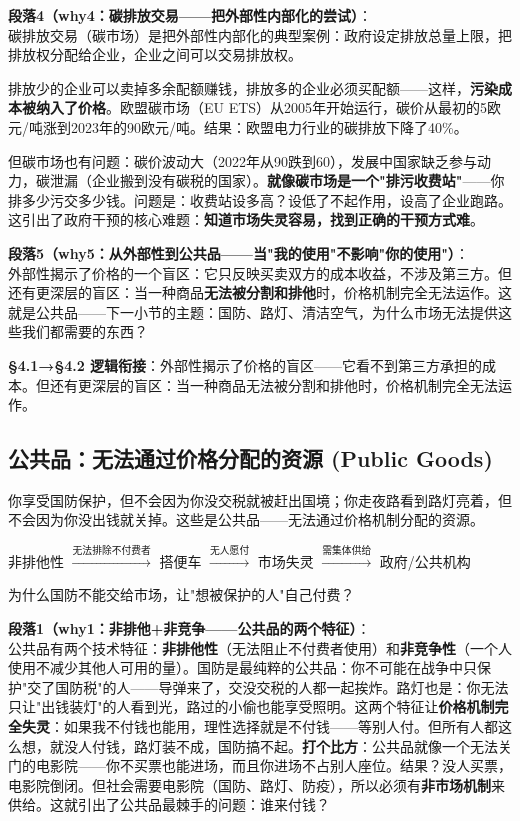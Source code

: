 \documentclass[../main.tex]{subfiles}
\begin{document}
	\textbf{段落4（why4：碳排放交易——把外部性内部化的尝试）}：\\
	碳排放交易（碳市场）是把外部性内部化的典型案例：政府设定排放总量上限，把排放权分配给企业，企业之间可以交易排放权。

	排放少的企业可以卖掉多余配额赚钱，排放多的企业必须买配额——这样，\textbf{污染成本被纳入了价格}。欧盟碳市场（EU ETS）从2005年开始运行，碳价从最初的5欧元/吨涨到2023年的90欧元/吨。结果：欧盟电力行业的碳排放下降了40\%。

	但碳市场也有问题：碳价波动大（2022年从90跌到60），发展中国家缺乏参与动力，碳泄漏（企业搬到没有碳税的国家）。\textbf{就像碳市场是一个"排污收费站"}——你排多少污交多少钱。问题是：收费站设多高？设低了不起作用，设高了企业跑路。这引出了政府干预的核心难题：\textbf{知道市场失灵容易，找到正确的干预方式难}。


	\textbf{段落5（why5：从外部性到公共品——当"我的使用"不影响"你的使用"）}：\\
	外部性揭示了价格的一个盲区：它只反映买卖双方的成本收益，不涉及第三方。但还有更深层的盲区：当一种商品\textbf{无法被分割和排他}时，价格机制完全无法运作。这就是公共品——下一小节的主题：国防、路灯、清洁空气，为什么市场无法提供这些我们都需要的东西？


	\textbf{§4.1→§4.2 逻辑衔接}：外部性揭示了价格的盲区——它看不到第三方承担的成本。但还有更深层的盲区：当一种商品无法被分割和排他时，价格机制完全无法运作。

	\subsection{公共品：无法通过价格分配的资源 (Public Goods)}
	\begin{motivation}
		你享受国防保护，但不会因为你没交税就被赶出国境；你走夜路看到路灯亮着，但不会因为你没出钱就关掉。这些是公共品——无法通过价格机制分配的资源。
	\end{motivation}
	\begin{logicmap}
		非排他性 $\xrightarrow{\text{无法排除不付费者}}$ 搭便车 $\xrightarrow{\text{无人愿付}}$ 市场失灵 $\xrightarrow{\text{需集体供给}}$ 政府/公共机构
	\end{logicmap}
	\begin{questionbox}
		为什么国防不能交给市场，让"想被保护的人"自己付费？
	\end{questionbox}

	\textbf{段落1（why1：非排他+非竞争——公共品的两个特征）}：\\
	公共品有两个技术特征：\textbf{非排他性}（无法阻止不付费者使用）和\textbf{非竞争性}（一个人使用不减少其他人可用的量）。国防是最纯粹的公共品：你不可能在战争中只保护"交了国防税"的人——导弹来了，交没交税的人都一起挨炸。路灯也是：你无法只让"出钱装灯"的人看到光，路过的小偷也能享受照明。这两个特征让\textbf{价格机制完全失灵}：如果我不付钱也能用，理性选择就是不付钱——等别人付。但所有人都这么想，就没人付钱，路灯装不成，国防搞不起。\textbf{打个比方}：公共品就像一个无法关门的电影院——你不买票也能进场，而且你进场不占别人座位。结果？没人买票，电影院倒闭。但社会需要电影院（国防、路灯、防疫），所以必须有\textbf{非市场机制}来供给。这就引出了公共品最棘手的问题：谁来付钱？
\end{document}
